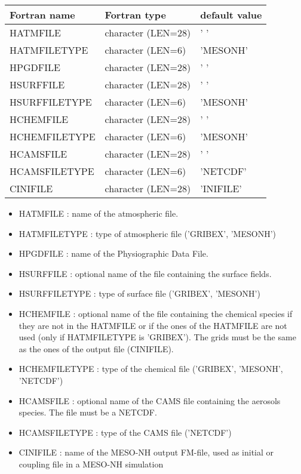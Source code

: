 \begin{center}
\begin{tabular} {|l|l|l|}
\hline
Fortran name & Fortran type & default value\\
\hline
\hline
HATMFILE      & character (LEN=28) & ' '           \\
HATMFILETYPE  & character (LEN=6)  & 'MESONH'      \\
HPGDFILE      & character (LEN=28) & ' '           \\
HSURFFILE     & character (LEN=28) & ' '           \\
HSURFFILETYPE & character (LEN=6)  & 'MESONH'      \\
HCHEMFILE     & character (LEN=28) & ' '           \\
HCHEMFILETYPE & character (LEN=6)  & 'MESONH'      \\
HCAMSFILE     & character (LEN=28) & ' '           \\
HCAMSFILETYPE & character (LEN=6)  & 'NETCDF'      \\
CINIFILE      & character (LEN=28) & 'INIFILE'     \\

\hline
\end{tabular}
\end{center}

\begin{itemize}
\item HATMFILE : name of the atmospheric file.
\item HATMFILETYPE : type of  atmospheric file ('GRIBEX', 'MESONH')
\item HPGDFILE : name of the Physiographic Data File.
\item HSURFFILE : optional name of the file containing the surface fields.
\item HSURFFILETYPE : type of surface file ('GRIBEX', 'MESONH')
\item HCHEMFILE : optional name of the file containing
the chemical species if they are not in the HATMFILE or if the ones of the
HATMFILE are not used (only if HATMFILETYPE is 'GRIBEX'). The grids must
be the same as the ones of the output file (CINIFILE).
\item HCHEMFILETYPE : type of the chemical file ('GRIBEX', 'MESONH', 'NETCDF')
\item HCAMSFILE : optional name of the CAMS file containing
the aerosols species. The file must be a NETCDF.
\item HCAMSFILETYPE : type of the CAMS file ('NETCDF')

\item CINIFILE : name of the MESO-NH output FM-file, used as initial
or coupling file in a MESO-NH simulation
\end{itemize}
